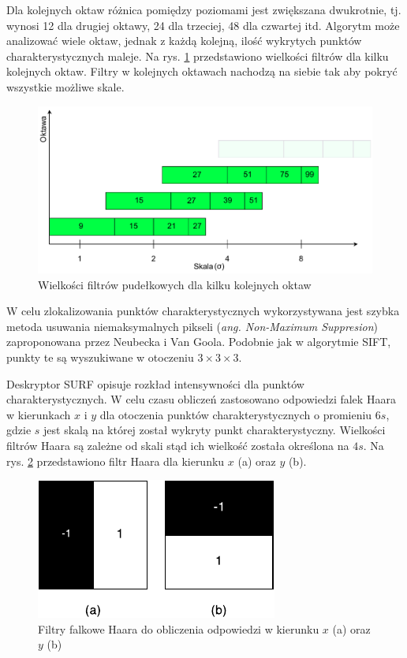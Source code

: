 Dla kolejnych oktaw różnica pomiędzy poziomami jest zwiększana dwukrotnie, tj. wynosi 12 dla drugiej oktawy, 24 dla trzeciej, 48 dla czwartej itd. Algorytm może analizować wiele oktaw, jednak z każdą kolejną, ilość wykrytych punktów charakterystycznych maleje. Na rys. \ref{fig:surf-octaves} przedstawiono wielkości filtrów dla kilku kolejnych oktaw. Filtry w kolejnych oktawach nachodzą na siebie tak aby pokryć wszystkie możliwe skale.

\begin{figure}[h]
	\centering
	\includegraphics[scale=0.7]{graphics/01_podstawy_teoretyczne/surf-octaves.pdf}
	\caption{Wielkości filtrów pudełkowych dla kilku kolejnych oktaw \cite{BAY08}}
	\label{fig:surf-octaves}
\end{figure}

W celu zlokalizowania punktów charakterystycznych wykorzystywana jest szybka metoda usuwania niemaksymalnych pikseli (\emph{ang. Non-Maximum Suppresion}) zaproponowana przez Neubecka i Van Goola\cite{NEUBECK06}. Podobnie jak w algorytmie SIFT, punkty te są wyszukiwane w otoczeniu $3 \times 3 \times 3$.

Deskryptor SURF opisuje rozkład intensywności dla punktów charakterystycznych. W celu czasu obliczeń zastosowano odpowiedzi falek Haara w kierunkach $x$ i $y$ dla otoczenia punktów charakterystycznych o promieniu $6s$, gdzie $s$ jest skalą na której został wykryty punkt charakterystyczny. Wielkości filtrów Haara są zależne od skali stąd ich wielkość została określona na $4s$. Na rys. \ref{fig:surf-haar-wavelet} przedstawiono filtr Haara dla kierunku $x$ (a) oraz $y$ (b).

\begin{figure}[h]
	\centering
	\includegraphics[scale=1.5]{graphics/01_podstawy_teoretyczne/surf-haar-wavelet.pdf}
	\caption{Filtry falkowe Haara do obliczenia odpowiedzi w kierunku $x$ (a) oraz $y$ (b) \cite{BAY08}}
	\label{fig:surf-haar-wavelet}
\end{figure}

